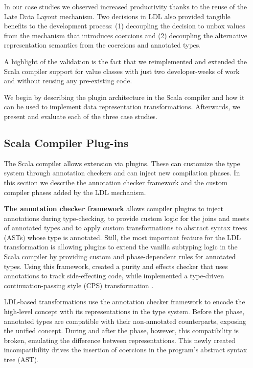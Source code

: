 In our case studies we observed increased productivity thanks to the reuse of the Late Data Layout mechanism. Two decisions in LDL also provided tangible benefits to the development process: (1) decoupling the decision to unbox values from the mechanism that introduces coercions and (2) decoupling the alternative representation semantics from the coercions and annotated types.

A highlight of the validation is the fact that we reimplemented and extended the Scala compiler support for value classes \cite{scala-value-classes-sip} with just two developer-weeks of work and without reusing any pre-existing code.

We begin by describing the plugin architecture in the Scala compiler and how it can be used to implement data representation transformations. Afterwards, we present and evaluate each of the three case studies.

\subsection{Scala Compiler Plug-ins}
\label{sec:validation/plugins}
The Scala compiler allows extension via plugins. These can customize the type system through annotation checkers and can inject new compilation phases. In this section we describe the annotation checker framework and the custom compiler phases added by the LDL mechanism.

\textbf{The annotation checker framework} allows compiler plugins to inject annotations during type-checking, to provide custom logic for the joins and meets of annotated types and to apply custom transformations to abstract syntax trees (ASTs) whose type is annotated. Still, the most important feature for the LDL transformation is allowing plugins to extend the vanilla subtyping logic in the Scala compiler by providing custom and phase-dependent rules for annotated types. Using this framework,  created a purity and effects checker \cite{lukas-thesis} that uses annotations to track side-effecting code, while  implemented a type-driven continuation-passing style (CPS) transformation \cite{tiark-cps}.

LDL-based transformations use the annotation checker framework to encode the high-level concept with its representations in the type system. Before the \coerce{} phase, annotated types are compatible with their non-annotated counterparts, exposing the unified concept. During and after the \coerce{} phase, however, this compatibility is broken, emulating the difference between representations. This newly created incompatibility drives the insertion of coercions in the program's abstract syntax tree (AST).


